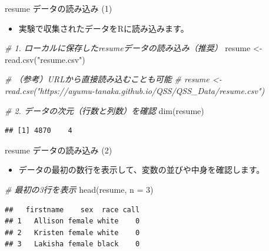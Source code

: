 \documentclass[
  ignorenonframetext,
]{beamer}
\newenvironment{Shaded}{\begin{snugshade}}{\end{snugshade}}
\newcommand{\AttributeTok}[1]{\textcolor[rgb]{0.77,0.63,0.00}{#1}}
\newcommand{\CommentTok}[1]{\textcolor[rgb]{0.56,0.35,0.01}{\textit{#1}}}
\newcommand{\DecValTok}[1]{\textcolor[rgb]{0.00,0.00,0.81}{#1}}
\newcommand{\FunctionTok}[1]{\textcolor[rgb]{0.00,0.00,0.00}{#1}}
\newcommand{\NormalTok}[1]{#1}
\newcommand{\OtherTok}[1]{\textcolor[rgb]{0.56,0.35,0.01}{#1}}
\newcommand{\StringTok}[1]{\textcolor[rgb]{0.31,0.60,0.02}{#1}}
\providecommand{\tightlist}{%
  \setlength{\itemsep}{0pt}\setlength{\parskip}{0pt}}
\begin{document}
\begin{frame}[fragile]{resume データの読み込み (1)}
\protect\hypertarget{resume-ux30c7ux30fcux30bfux306eux8aadux307fux8fbcux307f-1}{}
\begin{itemize}
\tightlist
\item
  実験で収集されたデータをRに読み込みます。
\end{itemize}

\scriptsize

\begin{Shaded}
\begin{Highlighting}[]
\CommentTok{\# 1. ローカルに保存したresumeデータの読み込み（推奨）}
\NormalTok{resume }\OtherTok{\textless{}{-}} \FunctionTok{read.csv}\NormalTok{(}\StringTok{"resume.csv"}\NormalTok{)}

\CommentTok{\# （参考）URLから直接読み込むことも可能}
\CommentTok{\# resume \textless{}{-} read.csv("https://ayumu{-}tanaka.github.io/QSS/QSS\_Data/resume.csv")}

\CommentTok{\# 2. データの次元（行数と列数）を確認}
\FunctionTok{dim}\NormalTok{(resume)}
\end{Highlighting}
\end{Shaded}

\begin{verbatim}
## [1] 4870    4
\end{verbatim}

\normalsize
\end{frame}

\begin{frame}[fragile]{resume データの読み込み (2)}
\protect\hypertarget{resume-ux30c7ux30fcux30bfux306eux8aadux307fux8fbcux307f-2}{}
\begin{itemize}
\tightlist
\item
  データの最初の数行を表示して、変数の並びや中身を確認します。
\end{itemize}

\scriptsize

\begin{Shaded}
\begin{Highlighting}[]
\CommentTok{\# 最初の3行を表示}
\FunctionTok{head}\NormalTok{(resume, }\AttributeTok{n =} \DecValTok{3}\NormalTok{)}
\end{Highlighting}
\end{Shaded}

\begin{verbatim}
##   firstname    sex  race call
## 1   Allison female white    0
## 2   Kristen female white    0
## 3   Lakisha female black    0
\end{verbatim}

\normalsize
\end{frame}
\end{document}
